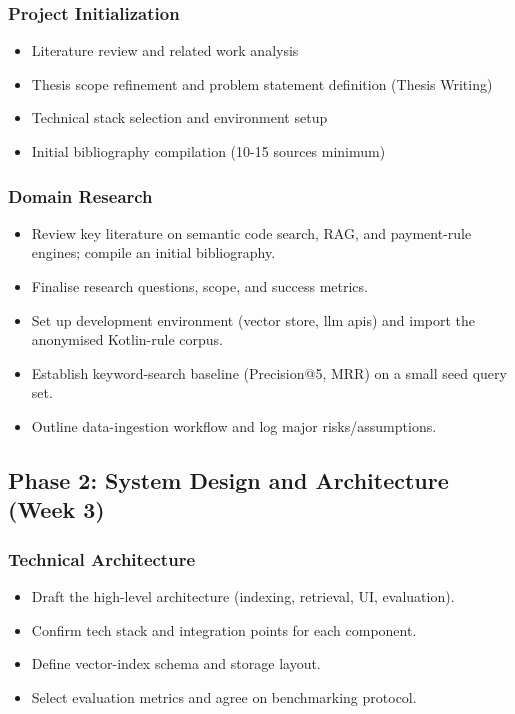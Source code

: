 \documentclass[11pt,a4paper]{article}
\begin{document}
\subsubsection{Project Initialization}
\begin{itemize}[leftmargin=2em]
    \item Literature review and related work analysis
    \item Thesis scope refinement and problem statement definition (Thesis Writing)
    \item Technical stack selection and environment setup
    \item Initial bibliography compilation (10-15 sources minimum)
\end{itemize}

\subsubsection{Domain Research}
\begin{itemize}[leftmargin=2em]
      \item Review key literature on semantic code search, RAG, and payment-rule engines; compile an initial bibliography.
  \item Finalise research questions, scope, and success metrics.
  \item Set up development environment (vector store, llm apis) and import the anonymised Kotlin-rule corpus.
  \item Establish keyword-search baseline (Precision@5, MRR) on a small seed query set.
  \item Outline data-ingestion workflow and log major risks/assumptions.
\end{itemize}

\subsection{Phase 2: System Design and Architecture (Week 3)}
\subsubsection{Technical Architecture}
\begin{itemize}[leftmargin=2em]
      \item Draft the high-level architecture (indexing, retrieval, UI, evaluation).
      \item Confirm tech stack and integration points for each component.
      \item Define vector-index schema and storage layout.
      \item Select evaluation metrics and agree on benchmarking protocol.
\end{itemize}
\end{document}

